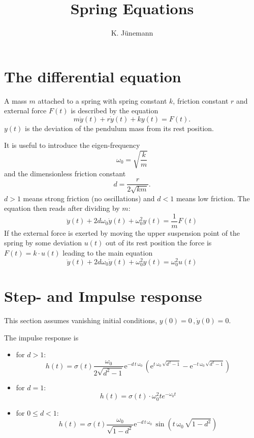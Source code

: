 \documentclass[paper=A4, pagesize, 12pt]{article}
\title{Spring Equations}
\author{K. Jünemann}
\begin{document}
\maketitle

\section{The differential equation}
A mass $m$ attached to a spring with spring constant $k$, friction constant
$r$ and external force $F(t)$ is described by the equation
\[
m \ddot{y}(t) + r \dot{y} (t) + k y(t) = F(t).
\]
$y(t)$ is the deviation of the pendulum mass from its rest position.

It is useful to introduce the eigen-frequency
\[
\omega_0 = \sqrt{\frac{k}{m}}
\]
and the dimensionless friction constant
\[
d = \frac{r}{2\sqrt{km}}.
\]
$d>1$ means strong friction (no oscillations) and $d<1$ means low friction.
The equation then reads after dividing by $m$:
\[
\ddot{y}(t) + 2 d \omega_0 \dot{y} (t) + \omega_0^2 y(t) = \frac{1}{m} F(t)
\]
If the external force is exerted by moving the upper suspension point of the
spring by some deviation $u(t)$ out of its rest position the force is $F(t) =
k\cdot u(t)$ leading to the main equation
\begin{equation}
  \label{eq:main}
  \ddot{y}(t) + 2 d \omega_0 \dot{y} (t) + \omega_0^2 y(t) = \omega_0^2 u(t)
\end{equation}

\section{Step- and Impulse response}
This section assumes vanishing initial conditions, $y(0) =0\, , \dot{y}(0) = 0$.

The impulse response is
\begin{itemize}
  \item for $d>1$:
  \[
  h(t) =
  \sigma(t) \frac{\omega_0}{2\sqrt{d^2 - 1}}
  \mathrm{e}^{- d\, t\, \mathrm{\omega_0}}\,
  \left(
    \mathrm{e}^{t\,
      \mathrm{\omega_0}\, \sqrt{d^2 - 1}} - \mathrm{e}^{- t\,
      \mathrm{\omega_0}\, \sqrt{d^2 - 1}}
  \right)
  \]
  \item for $d=1$:
  \[
  h(t) = \sigma(t) \cdot \omega_0^2 t e^{-\omega_0 t}
  \]
  \item for $0\leq d<1$:
  \[
  h(t) =
  \sigma(t) \frac{\omega_0}{\sqrt{1 - d^2}}
  \mathrm{e}^{- d\, t\, \mathrm{\omega_0}}\, \sin\!\left(t\,
    \mathrm{\omega_0}\, \sqrt{1 - d^2}\right)
  \]

\end{itemize}
\end{document}
